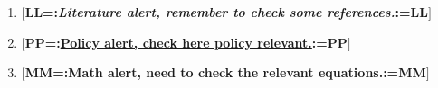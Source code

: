 \documentclass[12pt,english]{article}
\begin{document}
\newcommand{\AlertStr}{=:}
\newcommand{\AlertEnd}{:=}
\newcommand{\AlertLit}[1]{$\Big[$\textbf{LL\AlertStr}\emph{\textbf{\textcolor{ceruleanblue}{#1}}}\textbf{\AlertEnd LL}$\Big]$}
\newcommand{\AlertPol}[1]{$\Big[$\textbf{PP\AlertStr}\underline{\textbf{\textcolor{bronze}{#1}}}\textbf{\AlertEnd PP}$\Big]$}
\newcommand{\AlertMath}[1]{$\Big[$\textbf{MM\AlertStr}\thinspace\textbf{\textcolor{brightmaroon}{#1}}\textbf{\AlertEnd MM}$\Big]$}

\begin{enumerate}
  \item \AlertLit{Literature alert, remember to check some references.}
  \item \AlertPol{Policy alert, check here policy relevant.}
  \item \AlertMath{Math alert, need to check the relevant equations.}
\end{enumerate}
\end{document}
